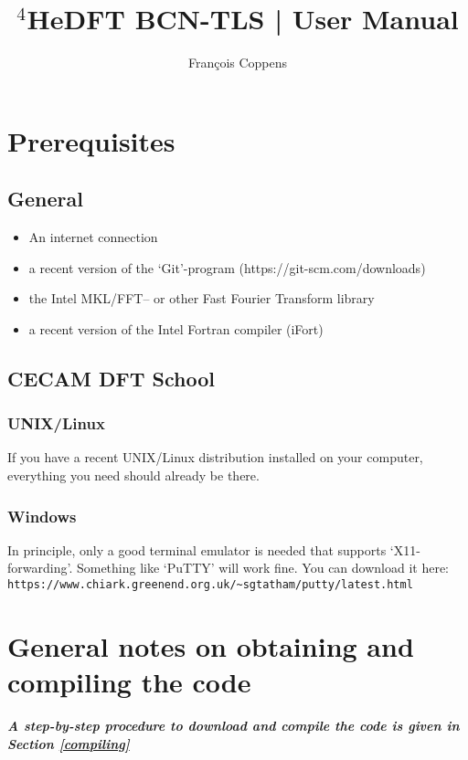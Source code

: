 \documentclass[10pt,a4paper]{article}
\author{Fran\c{c}ois Coppens}
\title{$^4$HeDFT BCN-TLS | User Manual }
\begin{document}
	\maketitle
	\tableofcontents
	\newpage
	\section{Prerequisites}
	\subsection{General}
	\begin{itemize}
		\item An internet connection
		\item a recent version of the `Git'-program (https://git-scm.com/downloads)
		\item the Intel MKL/FFT-- or other Fast Fourier Transform library
		\item a recent version of the Intel Fortran compiler (iFort)
	\end{itemize}
	
	\subsection{CECAM DFT School}
	\subsubsection{UNIX/Linux}
	If you have a recent UNIX/Linux distribution installed on your computer, everything you need should already be there.
	\subsubsection{Windows}
	In principle, only a good terminal emulator is needed that supports `X11-forwarding'. Something like `PuTTY' will work fine. You can download it here: {\color{lightblue}\verb|https://www.chiark.greenend.org.uk/~sgtatham/putty/latest.html|}
	
	\newpage
	\section{General notes on obtaining and compiling the code}
	
	{\color{red}\emph{\textbf{A step-by-step procedure to download and compile the code is given in Section \ref{compiling}}}}
	
\end{document}
